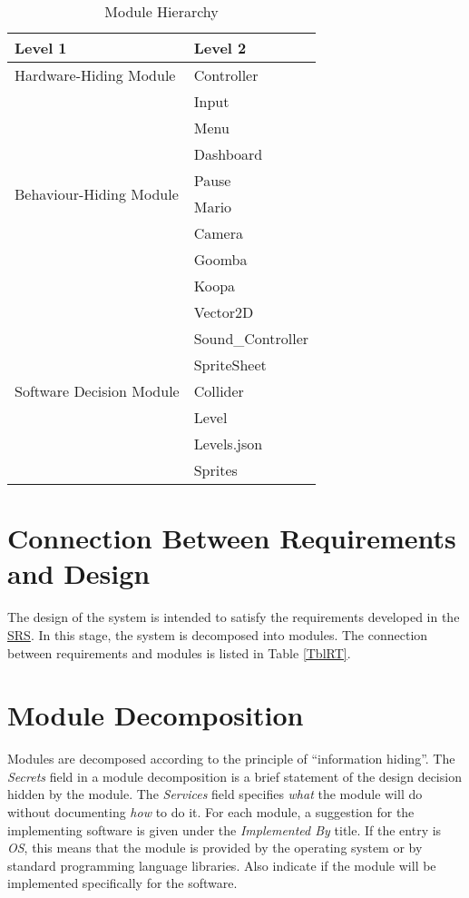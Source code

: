 \documentclass[12pt, titlepage]{article}
\begin{document}
\begin{table}[h!]
\centering
\begin{tabular}{p{} p{}}
\toprule
\textbf{Level 1} & \textbf{Level 2}\\
\midrule

{Hardware-Hiding Module} & Controller \\
\midrule

\multirow{8}{0.3\textwidth}{Behaviour-Hiding Module} & Input\\
& Menu \\
& Dashboard\\
& Pause\\
& Mario\\
& Camera\\
& Goomba \\
& Koopa \\
\midrule

\multirow{7}{0.3\textwidth}{Software Decision Module} & Vector2D\\
& Sound\_Controller\\
& SpriteSheet\\
& Collider\\
& Level\\
& Levels.json\\
& Sprites \\
\bottomrule

\end{tabular}
\caption{Module Hierarchy}
\label{TblMH}
\end{table}

\section{Connection Between Requirements and Design} \label{SecConnection}

The design of the system is intended to satisfy the requirements developed in
the \href{https://gitlab.cas.mcmaster.ca/jandric/super-refactored-mario-bros/-/blob/master/Doc/SRS/SRS.pdf}{SRS}. In this stage, the system is decomposed into modules. The connection between requirements and modules is listed in Table \ref{TblRT}.

\section{Module Decomposition} \label{SecMD}

Modules are decomposed according to the principle of ``information hiding''. The \emph{Secrets} field in a module
decomposition is a brief statement of the design decision hidden by the
module. The \emph{Services} field specifies \emph{what} the module will do
without documenting \emph{how} to do it. For each module, a suggestion for the
implementing software is given under the \emph{Implemented By} title. If the
entry is \emph{OS}, this means that the module is provided by the operating
system or by standard programming language libraries.  Also indicate if the
module will be implemented specifically for the software.
\end{document}
